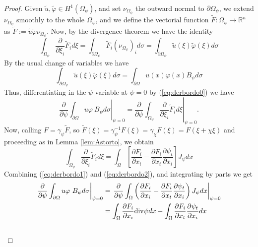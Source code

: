 \documentclass[a4paper,reqno,11pt,oneside]{amsart}
\theoremstyle{plain}
\theoremstyle{plain}
\theoremstyle{plain}
\theoremstyle{remark}
\def\div{\textup{div}}
\begin{document}
\begin{proof}
Given $\tilde u, \tilde \varphi\in H^1(\Omega_\psi)$, and set $\nu_{\Omega_\psi}$ the outward normal to $\partial \Omega_\psi$, we extend $\nu_{\Omega_\psi}$ smoothly to the whole $\Omega_\psi$, and we define the vectorial function $\tilde F:\Omega_\psi\rightarrow \mathbb{R}^n$ as $\tilde F:=\tilde u\tilde \varphi \nu_{\Omega_\psi}$.  Now, by the divergence theorem we have the identity
\begin{equation}\label{eq:derbordo0}
    \int_{\Omega_\psi}\frac{\partial}{\partial \xi_i}\tilde F_i d\xi=\int_{\partial \Omega_\psi}\tilde F_i(\nu_{\Omega_\psi})_i d\sigma =
    \int_{\partial \Omega_\psi}\tilde u(\xi) \tilde \varphi (\xi) d\sigma 
\end{equation}
By the usual change of variables we have $$\int_{\partial \Omega_\psi}\tilde u(\xi) \tilde \varphi (\xi) d\sigma= \int_{\partial \Omega} u(x)  \varphi (x) B_\psi d\sigma $$
Thus, differentiating in the $\psi$ variable at $\psi=0$ by  (\ref{eq:derbordo0})  we have 
\begin{equation}\label{eq:derbordo1}
    \left. \frac{\partial}{\partial \psi}\int_{\partial \Omega} u\varphi\ B_\psi d\sigma\right|_{\psi=0}=\left. \frac{\partial}{\partial \psi}
      \int_{\Omega_\psi}\frac{\partial}{\partial \xi_i}\tilde F_i d\xi
    \right|_{\psi=0}.
\end{equation}
Now, calling $F=\gamma_\psi \tilde F$, so $\tilde F (\xi)= \gamma_\psi^{-1} F(\xi)=\gamma_\chi F(\xi)=F(\xi +\chi \xi)$ and proceeding as in Lemma \ref{lem:Astorto}, we obtain 
\begin{equation}\label{eq:derbordo2}
 \int_{\Omega_\psi}\frac{\partial}{\partial \xi_i}\tilde F_i d\xi=
  \int_{\Omega}
 \left[
  \frac{\partial F_i}{\partial x_i}  -\frac{\partial  F_i }{\partial x_t}\frac{\partial \psi_t}{\partial x_i}
  \right] J_\psi dx
\end{equation}
Combining (\ref{eq:derbordo1}) and (\ref{eq:derbordo2}), and integrating by parts we get
$$\begin{aligned}
     \left. \frac{\partial}{\partial \psi}\int_{\partial \Omega} u\varphi\ B_\psi d\sigma\right|_{\psi=0}&=
      \left. \frac{\partial}{\partial \psi}
       \int_{\Omega}
       \left(\frac{\partial F_i}{\partial x_i}  -\frac{\partial  F_i }{\partial x_t}\frac{\partial \psi_t}{\partial x_i}\right) J_\psi dx\textbf{}  
        \right|_{\psi=0}\\ &
        =\int_\Omega \frac{\partial F_i}{\partial x_i}\div \psi dx-
        \int_\Omega \frac{\partial  F_i }{\partial x_t}\frac{\partial \psi_t}{\partial x_i}dx\\ &

\end{aligned}$$
\end{proof}
\end{document}
